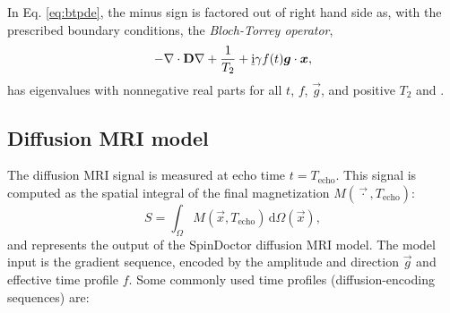 \documentclass[a4paper]{article}
\begin{document}
In Eq. \eqref{eq:btpde}, the minus sign is factored out of right hand side as, with the prescribed boundary conditions, the \emph{Bloch-Torrey operator}, $$-\nabla \cdot \mathbf{D} \nabla + \frac{1}{T_2} + \underline{\mathrm{i}} \gamma f(t) \bm{g} \cdot \bm{x},$$ has eigenvalues with nonnegative real parts for all $t$, $f$, $\vec{g}$, and positive $T_2$ and .



\subsection{Diffusion MRI model}

The diffusion MRI signal is measured at echo time $t = T_\text{echo}$. This signal is computed as the spatial integral  of the final magnetization $M(\vec{\cdot}, T_\text{echo})$:
\begin{equation}\label{eq:signal}
    S = \int_\Omega M(\vec{x}, T_\text{echo}) \, \mathrm{d} \Omega(\vec{x}),
\end{equation}
and represents the output of the SpinDoctor diffusion MRI model. The model input is the gradient sequence, encoded by the amplitude and direction $\vec{g}$ and effective time profile $f$. Some commonly used time profiles (diffusion-encoding sequences) are:
\end{document}
